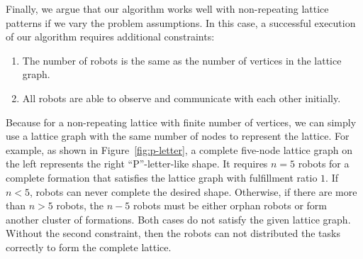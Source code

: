 Finally, we argue that our algorithm works well with non-repeating lattice patterns if we vary the problem assumptions.
%
In this case, a successful execution of our algorithm requires additional constraints: 
\begin{enumerate}
  \item The number of robots is the same as the number of vertices in the lattice graph.
  \item All robots are able to observe and communicate with each other initially.
\end{enumerate}
Because for a non-repeating lattice with finite number of vertices, 
we can simply use a lattice graph with the same number of nodes to represent the lattice.
%
For example, as shown in Figure~\ref{fig:p-letter}, %
a complete five-node lattice graph on the left represents the right ``P''-letter-like shape. 
%
It requires $n=5$ robots for a complete formation that satisfies the lattice graph with fulfillment ratio $1$.
If $n<5$, robots can never complete the desired shape. 
Otherwise, if there are more than $n>5$ robots, the $n-5$ robots must be either orphan robots or form another cluster of formations. 
Both cases do not satisfy the given lattice graph. 
% 
Without the second constraint, then the robots can not distributed the tasks correctly to form the complete lattice.
